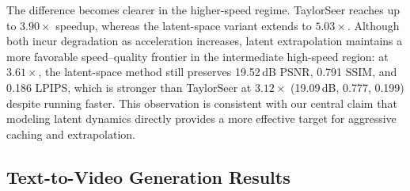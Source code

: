 The difference becomes clearer in the higher-speed regime.
TaylorSeer reaches up to \(3.90\times\) speedup,
whereas the latent-space variant extends to \(5.03\times\).
Although both incur degradation as acceleration increases,
latent extrapolation maintains a more favorable speed--quality frontier
in the intermediate high-speed region:
at \(3.61\times\),
the latent-space method still preserves
19.52\,dB PSNR, 0.791 SSIM, and 0.186 LPIPS,
which is stronger than TaylorSeer at \(3.12\times\)
(19.09\,dB, 0.777, 0.199)
despite running faster.
This observation is consistent with our central claim that
modeling latent dynamics directly
provides a more effective target for aggressive caching and extrapolation.

\subsection{Text-to-Video Generation Results}
